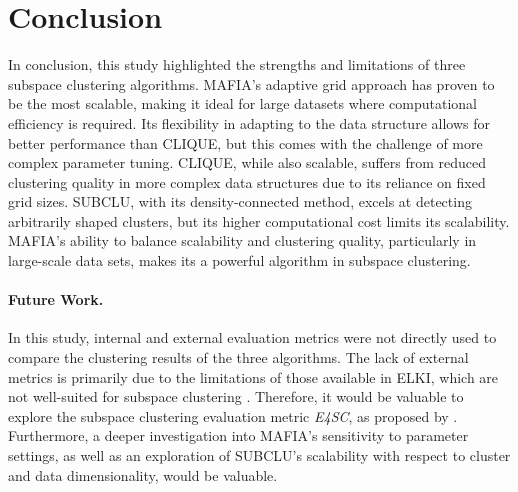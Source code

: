\section{Conclusion}
In conclusion, this study highlighted the strengths and limitations of three subspace clustering algorithms. MAFIA's adaptive grid approach has proven to be the most scalable, making it ideal for large datasets where computational efficiency is required. Its flexibility in adapting to the data structure allows for better performance than CLIQUE, but this comes with the challenge of more complex parameter tuning. CLIQUE, while also scalable, suffers from reduced clustering quality in more complex data structures due to its reliance on fixed grid sizes. SUBCLU, with its density-connected method, excels at detecting arbitrarily shaped clusters, but its higher computational cost limits its scalability. MAFIA's ability to balance scalability and clustering quality, particularly in large-scale data sets, makes its a powerful algorithm in subspace clustering.

\paragraph{Future Work.}
In this study, internal and external evaluation metrics were not directly used to compare the clustering results of the three algorithms. The lack of external metrics is primarily due to the limitations of those available in ELKI, which are not well-suited for subspace clustering \cite{e4sc}. Therefore, it would be valuable to explore the subspace clustering evaluation metric \textit{E4SC}, as proposed by \cite{e4sc}. Furthermore, a deeper investigation into MAFIA's sensitivity to parameter settings, as well as an exploration of SUBCLU's scalability with respect to cluster and data dimensionality, would be valuable.